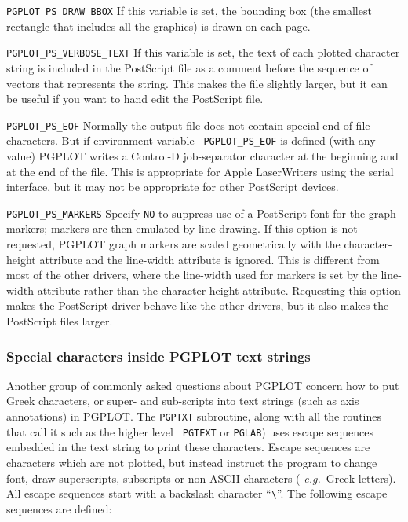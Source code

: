 \documentclass[twoside,11pt]{article}
\begin{document}
\begin{description}
\item{{\tt PGPLOT\_PS\_DRAW\_BBOX}} If this variable is set, the
bounding box (the smallest rectangle that includes all the graphics)
is drawn on each page.
 
\item{{\tt PGPLOT\_PS\_VERBOSE\_TEXT}} If this variable is set, the
text of each plotted character string is included in the PostScript
file as a comment before the sequence of vectors that represents the
string. This makes the file slightly larger, but it can be useful if
you want to hand edit the PostScript file.
 
\item{{\tt PGPLOT\_PS\_EOF}} Normally the output file does not contain
special end-of-file characters. But if environment variable {\tt
PGPLOT\_PS\_EOF} is defined (with any value) PGPLOT writes a Control-D
job-separator character at the beginning and at the end of the file.
This is appropriate for Apple LaserWriters using the serial interface,
but it may not be appropriate for other PostScript devices.
 
\item{{\tt PGPLOT\_PS\_MARKERS}} Specify {\tt NO} to suppress use of a
PostScript font for the graph markers; markers are then emulated by
line-drawing. If this option is not requested, PGPLOT graph markers
are scaled geometrically with the character-height attribute and the
line-width attribute is ignored. This is different from most of the
other drivers, where the line-width used for markers is set by the
line-width attribute rather than the character-height attribute.
Requesting this option makes the PostScript driver behave like the
other drivers, but it also makes the PostScript files larger. 

\end{description}

\subsubsection{Special characters inside PGPLOT text strings}

Another group of commonly asked questions about PGPLOT concern how to
put Greek characters, or super- and sub-scripts into text strings
(such as axis annotations) in PGPLOT. The {\tt PGPTXT} subroutine,
along with all the routines that call it such as the higher level {\tt
PGTEXT} or {\tt PGLAB}) uses escape sequences embedded in the text
string to print these characters. Escape sequences are characters
which are not plotted, but instead instruct the program to change
font, draw superscripts, subscripts or non-ASCII characters ({\em
e.g.\ }Greek letters). All escape sequences start with a backslash
character ``\verb*|\|''. The following escape sequences are defined:
\end{document}
